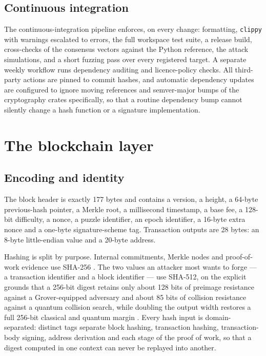 \documentclass{article}
\begin{document}
\subsection{Continuous integration}

The continuous-integration pipeline enforces, on every change: formatting,
\texttt{clippy} with warnings escalated to errors, the full workspace test suite,
a release build, cross-checks of the consensus vectors against the Python
reference, the attack simulations, and a short fuzzing pass over every
registered target. A separate weekly workflow runs dependency auditing and
licence-policy checks. All third-party actions are pinned to commit hashes, and
automatic dependency updates are configured to ignore moving references and
semver-major bumps of the cryptography crates specifically, so that a routine
dependency bump cannot silently change a hash function or a signature
implementation.


\section{The blockchain layer}
\label{sec:l1}

\subsection{Encoding and identity}

The block header is exactly 177 bytes and contains a version, a height, a
64-byte previous-hash pointer, a Merkle root, a millisecond timestamp, a base
fee, a 128-bit difficulty, a nonce, a puzzle identifier, an epoch identifier, a
16-byte extra nonce and a one-byte signature-scheme tag. Transaction outputs
are 28 bytes: an 8-byte little-endian value and a 20-byte address.

Hashing is split by purpose. Internal commitments, Merkle nodes and proof-of-work
evidence use SHA-256 \cite{nist-fips180-4}. The two values an attacker most
wants to forge --- a transaction identifier and a block identifier --- use
SHA-512, on the explicit grounds that a 256-bit digest retains only about 128
bits of preimage resistance against a Grover-equipped adversary and about 85
bits of collision resistance against a quantum collision search, while doubling
the output width restores a full 256-bit classical and quantum margin
\cite{shor1994algorithms,grover1996fast}. Every hash input is domain-separated:
distinct tags separate block hashing, transaction hashing, transaction-body
signing, address derivation and each stage of the proof of work, so that a
digest computed in one context can never be replayed into another.
\end{document}
